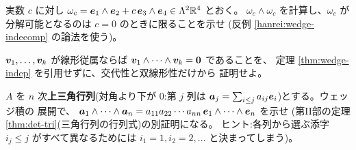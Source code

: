 \begin{mondai}[発展]\label{q:wedge-ex9}
実数 $c$ に対し $\omega_c = \bm{e}_1 \wedge \bm{e}_2
+ c\,\bm{e}_3 \wedge \bm{e}_4 \in \Lambda^2 \mathbb{R}^4$ とおく。
$\omega_c \wedge \omega_c$ を計算し、$\omega_c$ が分解可能となるのは
$c = 0$ のときに限ることを示せ
(反例 \ref{hanrei:wedge-indecomp} の論法を使う)。
\end{mondai}

\begin{mondai}[証明]\label{q:wedge-ex10}
$\bm{v}_1, \dots, \bm{v}_k$ が線形従属ならば
$\bm{v}_1 \wedge \cdots \wedge \bm{v}_k = \bm{0}$ であることを、
定理 \ref{thm:wedge-indep} を引用せずに、交代性と双線形性だけから
証明せよ。
\end{mondai}

\begin{mondai}[証明]\label{q:wedge-ex11}
$A$ を $n$ 次\textbf{上三角行列}(対角より下が $0$:第 $j$ 列は
$\bm{a}_j = \sum_{i \le j} a_{ij}\bm{e}_i$)とする。ウェッジ積の
展開で、
$\bm{a}_1 \wedge \cdots \wedge \bm{a}_n = a_{11}a_{22}\cdots a_{nn}\,
\bm{e}_1 \wedge \cdots \wedge \bm{e}_n$ を示せ
(第II部の定理 \ref{thm:det-tri}(三角行列の行列式)の別証明になる。
ヒント:各列から選ぶ添字 $i_j \le j$ がすべて異なるためには
$i_1 = 1, i_2 = 2, \dots$ と決まってしまう)。
\end{mondai}

